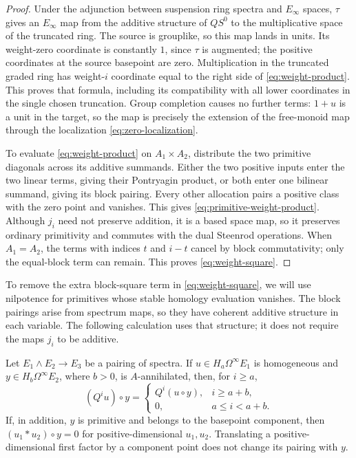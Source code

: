 \begin{proof}
Under the adjunction between suspension ring spectra and
$E_\infty$ spaces, $\tau$ gives an $E_\infty$ map from the additive
structure of $QS^0$ to the multiplicative space of the truncated ring.
The source is grouplike, so this map lands in units.  Its weight-zero
coordinate is constantly $1$, since $\tau$ is augmented; the
positive coordinates at the source basepoint are zero.  Multiplication
in the truncated graded ring has weight-$i$ coordinate equal to the
right side of \eqref{eq:weight-product}.  This proves that formula,
including its compatibility with all lower coordinates in the single
chosen truncation.  Group completion causes no further terms:
$1+u$ is a unit in the target, so the map is precisely the extension
of the free-monoid map through the localization
\eqref{eq:zero-localization}.

To evaluate \eqref{eq:weight-product} on $A_1\times A_2$, distribute
the two primitive diagonals across its additive summands.  Either the
two positive inputs enter the two linear terms, giving their
Pontryagin product, or both enter one bilinear summand, giving its
block pairing.  Every other allocation pairs a positive class with
the zero point and vanishes.  This gives
\eqref{eq:primitive-weight-product}.  Although $j_i$ need not preserve
addition, it is a based space map, so it preserves ordinary
primitivity and commutes with the dual Steenrod operations.
When $A_1=A_2$, the terms with indices $t$ and $i-t$ cancel by block
commutativity; only the equal-block term can remain.  This proves
\eqref{eq:weight-square}.
\end{proof}

To remove the extra block-square term in \eqref{eq:weight-square},
we will use nilpotence for primitives whose stable homology evaluation
vanishes. The block pairings arise from spectrum maps, so they have
coherent additive structure in each variable. The following calculation
uses that structure; it does not require the maps $j_i$ to be additive.

\begin{lemma}
\label{lem:pairing}
Let $E_1\wedge E_2\to E_3$ be a pairing of spectra.  If
$u\in H_a\Omega^\infty E_1$ is homogeneous and
$y\in H_b\Omega^\infty E_2$, where $b>0$, is $A$-annihilated, then,
for $i\geq a$,
\begin{equation}
\label{eq:pairing-rule}
 (Q^i u)\circ y=
 \begin{cases}
 Q^i(u\circ y),&i\geq a+b,\\
 0,&a\leq i<a+b.
 \end{cases}
\end{equation}
If, in addition, $y$ is primitive and belongs to the basepoint component,
then $(u_1*u_2)\circ y=0$ for positive-dimensional $u_1,u_2$.
Translating a positive-dimensional first factor by a component point
does not change its pairing with $y$.
\end{lemma}

